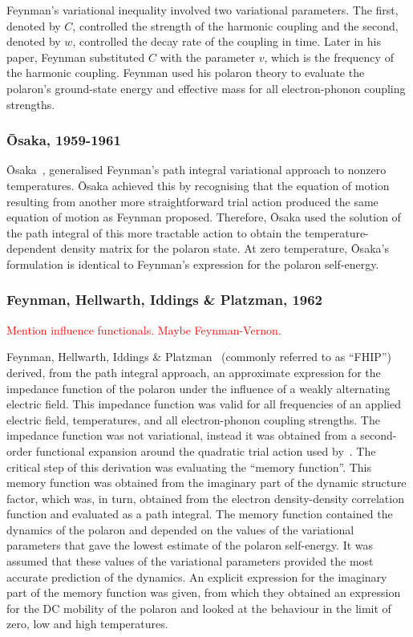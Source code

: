 Feynman's variational inequality involved two variational parameters. The first, denoted by $C$, controlled the strength of the harmonic coupling and the second, denoted by $w$, controlled the decay rate of the coupling in time. Later in his paper, Feynman substituted $C$ with the parameter $v$, which is the frequency of the harmonic coupling. Feynman used his polaron theory to evaluate the polaron's ground-state energy and effective mass for all electron-phonon coupling strengths.

\subsubsection{\=Osaka, 1959-1961}
\label{subsubsec:2-1-1-4}

\=Osaka~\cite{osaka_polaron_1959, osaka_theory_1961}, generalised Feynman's path integral variational approach to nonzero temperatures. \=Osaka achieved this by recognising that the equation of motion resulting from another more straightforward trial action produced the same equation of motion as Feynman proposed. Therefore, \=Osaka used the solution of the path integral of this more tractable action to obtain the temperature-dependent density matrix for the polaron state. At zero temperature, \=Osaka's formulation is identical to Feynman's expression for the polaron self-energy.

\subsubsection{Feynman, Hellwarth, Iddings \& Platzman, 1962}
\label{subsubsec:2-1-1-5}

\textcolor{red}{Mention influence functionals. Maybe Feynman-Vernon.}

Feynman, Hellwarth, Iddings \& Platzman~\cite{feynman_mobility_1962} (commonly referred to as ``FHIP'') derived, from the path integral approach, an approximate expression for the impedance function of the polaron under the influence of a weakly alternating electric field. This impedance function was valid for all frequencies of an applied electric field, temperatures, and all electron-phonon coupling strengths. The impedance function was not variational, instead it was obtained from a second-order functional expansion around the quadratic trial action used by~\cite{feynman_slow_1955}. The critical step of this derivation was evaluating the ``memory function''. This memory function was obtained from the imaginary part of the dynamic structure factor, which was, in turn, obtained from the electron density-density correlation function and evaluated as a path integral. The memory function contained the dynamics of the polaron and depended on the values of the variational parameters that gave the lowest estimate of the polaron self-energy. It was assumed that these values of the variational parameters provided the most accurate prediction of the dynamics. An explicit expression for the imaginary part of the memory function was given, from which they obtained an expression for the DC mobility of the polaron and looked at the behaviour in the limit of zero, low and high temperatures.

